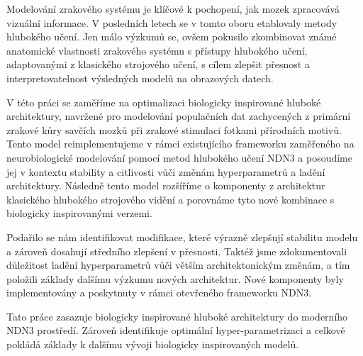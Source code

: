 \documentclass[12pt]{report}
\begin{document}

Modelování zrakového systému je klíčové k pochopení, jak mozek zpracovává vizuální informace. V posledních letech se v tomto oboru etablovaly metody hlubokého učení. Jen málo výzkumů se, ovšem pokusilo zkombinovat známé anatomické vlastnosti zrakového systému s přístupy hlubokého učení, adaptovanými z klasického strojového učení, s cílem zlepšit přesnost a interpretovatelnost výsledných modelů na obrazových datech.

V této práci se zaměříme na optimalizaci biologicky inspirované hluboké architektury, navržené pro modelování populačních dat zachycených z primární zrakové kůry savčích mozků při zrakové stimulaci fotkami přírodních motivů. Tento model reimplementujeme v rámci existujícího frameworku zaměřeného na neurobiologické modelování pomocí metod hlubokého učení NDN3 a posoudíme jej v kontextu stability a citlivosti vůči změnám hyperparametrů a ladění architektury. Následně tento model rozšíříme o komponenty z architektur klasického hlubokého strojového vidění a porovnáme tyto nové kombinace s biologicky inspirovanými verzemi.

Podařilo se nám identifikovat modifikace, které výrazně zlepšují stabilitu modelu a zároveň dosahují středního zlepšení v přesnosti. Taktéž jsme zdokumentovali důležitost ladění hyperparametrů vůči větším architektonickým změnám, a tím položili základy dalšímu výzkumu nových architektur. Nové komponenty byly implementovány a poskytnuty v rámci otevřeného frameworku NDN3.

Tato práce zasazuje biologicky inspirované hluboké architektury do moderního NDN3 prostředí. Zároveň identifikuje optimální hyper-parametrizaci a celkově pokládá základy k dalšímu vývoji biologicky inspirovaných modelů.
\end{document}
